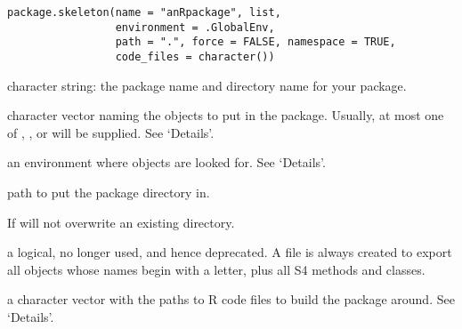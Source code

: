 %
\begin{Usage}
\begin{verbatim}
package.skeleton(name = "anRpackage", list,
                 environment = .GlobalEnv,
                 path = ".", force = FALSE, namespace = TRUE,
                 code_files = character())
\end{verbatim}
\end{Usage}
%
\begin{Arguments}
\begin{ldescription}
\item[\code{name}] character string: the package name and directory name for
your package.
\item[\code{list}] character vector naming the \R{} objects to put in the
package.  Usually, at most one of , ,
or  will be supplied.  See `Details'.
\item[\code{environment}] an environment where objects are looked for.  See
`Details'.
\item[\code{path}] path to put the package directory in.
\item[\code{force}] If  will not overwrite an existing directory.
\item[\code{namespace}] a logical, no longer used, and hence deprecated.  A
 file is always created to export all objects whose
names begin with a letter, plus all S4 methods and classes.
\item[\code{code\_files}] a character vector with the paths to R code files to
build the package around.  See `Details'.
\end{ldescription}
\end{Arguments}
%
